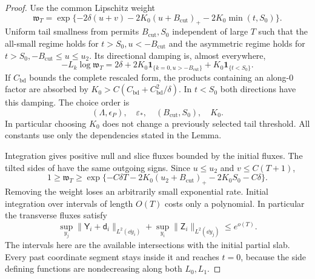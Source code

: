 \begin{proof}
Use the common Lipschitz weight
\begin{equation}\label{dn:high-weight}
 \mathfrak w_T=
 \exp\{-2\delta(u+v)-2K_0(u+B_{\mathrm{cut}})_+
                         -2K_0\min(t,S_0)\}.
\end{equation}
Uniform tail smallness from  permits
$B_{\mathrm{cut}},S_0$ independent of large $T$ such that the
all-small regime holds for $t>S_0,u<-B_{\mathrm{cut}}$ and the
asymmetric regime holds for $t>S_0,-B_{\mathrm{cut}}\le u\le u_2$.
Its directional damping is, almost everywhere,
\[
 -L_k\log\mathfrak w_T
 =2\delta+2K_0\mathbf1_{\{k=0, u>-B_{\mathrm{cut}}\}}
                         +K_0\mathbf1_{\{t<S_0\}}.
\]
If $C_{\mathrm{bd}}$ bounds the complete rescaled form, the products
containing an along-$0$ factor are absorbed by
$K_0>C(C_{\mathrm{bd}}+C_{\mathrm{bd}}^2/\delta)$.
In $t<S_0$ both directions have this damping.  The choice order is
\[
 (\Lambda,\epsilon_P),\quad\varepsilon_*,\quad
                  (B_{\mathrm{cut}},S_0),\quad K_0.
\]
In particular choosing $K_0$ does not change a previously selected
tail threshold.  All constants use only the dependencies stated in
the Lemma.

Integration gives positive null and slice fluxes bounded by the
initial fluxes.  The tilted sides of  have the same
outgoing signs.  Since $u\le u_2$ and $v\le C(T+1)$,
\[
 1\ge\mathfrak w_T\ge
  \exp\{-C\delta T-2K_0(u_2+B_{\mathrm{cut}})_+-2K_0S_0-C\delta\}.
\]
Removing the weight loses an arbitrarily small exponential rate.
Initial integration over intervals of length $O(T)$ costs only a
polynomial.  In particular the transverse fluxes satisfy
\begin{equation}\label{dn:high-transverse}
 \sup_{y_j}\|\mathsf Y_i+\mathsf d_i\|_{L^2(\dd y_i)}
 +\sup_{y_i}\|\mathsf Z_i\|_{L^2(\dd y_j)}
                         \le e^{o(T)}.
\end{equation}
The intervals here are the available intersections with the initial
partial slab.  Every past coordinate segment stays inside it and
reaches $t=0$, because the side defining functions are nondecreasing
along both $L_0,L_1$.


\end{proof}
